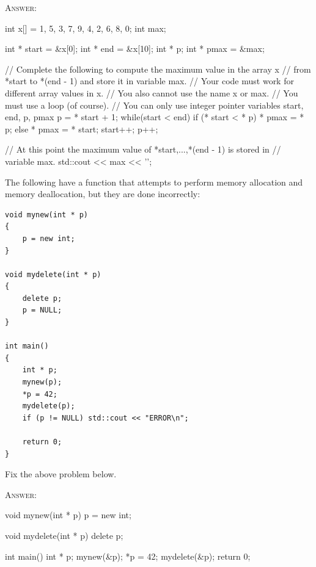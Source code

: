 \textsc{Answer:}
\begin{answercode}
int x[] = {1, 5, 3, 7, 9, 4, 2, 6, 8, 0};
int max;

int * start = &x[0];
int * end = &x[10];
int * p;
int * pmax = &max;

// Complete the following to compute the maximum value in the array x
// from *start to *(end - 1) and store it in variable max.
// Your code must work for different array values in x.
// You also cannot use the name x or max.
// You must use a loop (of course).
// You can only use integer pointer variables start, end, p, pmax
p = * start + 1;
while(start < end)
{
  if (* start < * p)
  {
    * pmax = * p;
  }
  else
  {
    * pmax = * start;
  }
  start++;
  p++;
}




// At this point the maximum value of *start,...,*(end - 1) is stored in
// variable max.
std::cout << max << '\n';
\end{answercode}

\newpage
\nextq
The following have a function that attempts to perform memory allocation
and memory deallocation, but
they are done incorrectly:
\vspace{-3mm}
\begin{Verbatim}[frame=single,fontsize=\small]
void mynew(int * p)
{
    p = new int;
}

void mydelete(int * p)
{
    delete p;
    p = NULL;
}

int main()
{
    int * p;
    mynew(p);
    *p = 42;
    mydelete(p);
    if (p != NULL) std::cout << "ERROR\n";
    
    return 0;
}
\end{Verbatim}
\vspace{-5mm}Fix the above problem below.

\textsc{Answer:}\vspace{-3mm}
\begin{answercode}
void mynew(int * p)
{
  p = new int;
}

void mydelete(int * p)
{
  delete p;
}

int main()
{
    int * p;
    mynew(&p);
    *p = 42;
    mydelete(&p);
    return 0;
}
\end{answercode}

